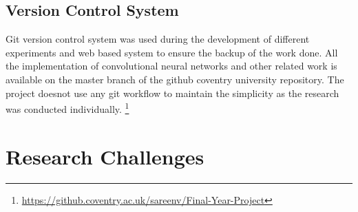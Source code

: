 \subsection{Version Control System}
Git version control system was used during the development of different experiments and web based system 
to ensure the backup of the work done. All the implementation of convolutional neural 
networks and other related work is available on the master branch of the github coventry
university repository. The project doesnot use any git workflow to maintain the simplicity as 
the research was conducted individually. 
\footnote{\url{https://github.coventry.ac.uk/sareenv/Final-Year-Project}}
\pagebreak
\section{Research Challenges}
